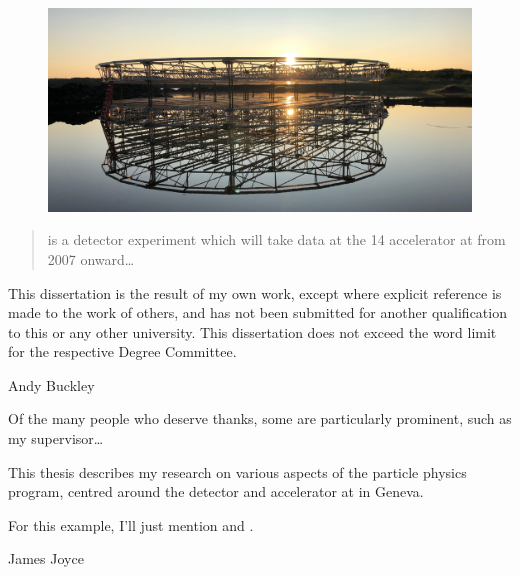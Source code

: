 
\begin{figure}
    \includegraphics[width=\largefigwidth]{diagrams/4-chips/sunrise}
\end{figure}

\begin{abstract}%
    \LHCb is a \bphysics detector experiment which will take data at
    the \unit{14}{\TeV} \LHC accelerator at \CERN from 2007 onward\dots
\end{abstract}


\begin{declaration}
    This dissertation is the result of my own work, except where explicit
    reference is made to the work of others, and has not been submitted
    for another qualification to this or any other university. This
    dissertation does not exceed the word limit for the respective Degree
    Committee.
    \vspace*{1cm}
    \begin{flushright}
        Andy Buckley
    \end{flushright}
\end{declaration}


\begin{acknowledgements}
    Of the many people who deserve thanks, some are particularly prominent,
    such as my supervisor\dots
\end{acknowledgements}


\begin{preface}
    This thesis describes my research on various aspects of the \LHCb
    particle physics program, centred around the \LHCb detector and \LHC
    accelerator at \CERN in Geneva.

    \noindent
    For this example, I'll just mention 
    and .
\end{preface}

\tableofcontents

%
{James Joyce}
\thispagestyle{empty}
